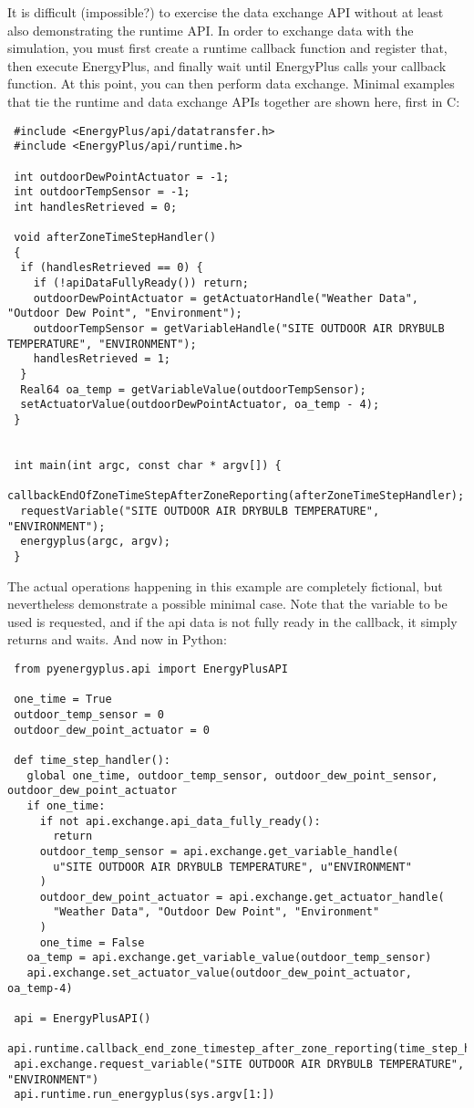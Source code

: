 It is difficult (impossible?) to exercise the data exchange API without at least also demonstrating the runtime API.
In order to exchange data with the simulation, you must first create a runtime callback function and register that, then execute EnergyPlus, and finally wait until EnergyPlus calls your callback function.
At this point, you can then perform data exchange.
Minimal examples that tie the runtime and data exchange APIs together are shown here, first in C:

\begin{lstlisting}
 #include <EnergyPlus/api/datatransfer.h>
 #include <EnergyPlus/api/runtime.h>

 int outdoorDewPointActuator = -1;
 int outdoorTempSensor = -1;
 int handlesRetrieved = 0;

 void afterZoneTimeStepHandler()
 {
  if (handlesRetrieved == 0) {
    if (!apiDataFullyReady()) return;
    outdoorDewPointActuator = getActuatorHandle("Weather Data", "Outdoor Dew Point", "Environment");
    outdoorTempSensor = getVariableHandle("SITE OUTDOOR AIR DRYBULB TEMPERATURE", "ENVIRONMENT");
    handlesRetrieved = 1;
  }
  Real64 oa_temp = getVariableValue(outdoorTempSensor);
  setActuatorValue(outdoorDewPointActuator, oa_temp - 4);
 }


 int main(int argc, const char * argv[]) {
  callbackEndOfZoneTimeStepAfterZoneReporting(afterZoneTimeStepHandler);
  requestVariable("SITE OUTDOOR AIR DRYBULB TEMPERATURE", "ENVIRONMENT");
  energyplus(argc, argv);
 }
\end{lstlisting}

The actual operations happening in this example are completely fictional, but nevertheless demonstrate a possible minimal case.
Note that the variable to be used is requested, and if the api data is not fully ready in the callback, it simply returns and waits.
And now in Python:

\begin{lstlisting}
 from pyenergyplus.api import EnergyPlusAPI

 one_time = True
 outdoor_temp_sensor = 0
 outdoor_dew_point_actuator = 0

 def time_step_handler():
   global one_time, outdoor_temp_sensor, outdoor_dew_point_sensor, outdoor_dew_point_actuator
   if one_time:
     if not api.exchange.api_data_fully_ready():
       return
     outdoor_temp_sensor = api.exchange.get_variable_handle(
       u"SITE OUTDOOR AIR DRYBULB TEMPERATURE", u"ENVIRONMENT"
     )
     outdoor_dew_point_actuator = api.exchange.get_actuator_handle(
       "Weather Data", "Outdoor Dew Point", "Environment"
     )
     one_time = False
   oa_temp = api.exchange.get_variable_value(outdoor_temp_sensor)
   api.exchange.set_actuator_value(outdoor_dew_point_actuator, oa_temp-4)

 api = EnergyPlusAPI()
 api.runtime.callback_end_zone_timestep_after_zone_reporting(time_step_handler)
 api.exchange.request_variable("SITE OUTDOOR AIR DRYBULB TEMPERATURE", "ENVIRONMENT")
 api.runtime.run_energyplus(sys.argv[1:])
\end{lstlisting}

